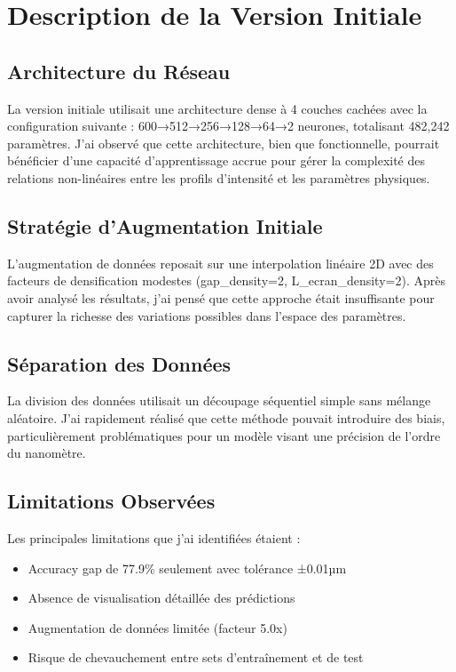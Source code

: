 \documentclass[10pt,twocolumn]{article}
\begin{document}
\section{Description de la Version Initiale}

\subsection{Architecture du Réseau}

La version initiale utilisait une architecture dense à 4 couches cachées avec la configuration suivante : 600→512→256→128→64→2 neurones, totalisant 482,242 paramètres. J'ai observé que cette architecture, bien que fonctionnelle, pourrait bénéficier d'une capacité d'apprentissage accrue pour gérer la complexité des relations non-linéaires entre les profils d'intensité et les paramètres physiques.

\subsection{Stratégie d'Augmentation Initiale}

L'augmentation de données reposait sur une interpolation linéaire 2D avec des facteurs de densification modestes (gap\_density=2, L\_ecran\_density=2). Après avoir analysé les résultats, j'ai pensé que cette approche était insuffisante pour capturer la richesse des variations possibles dans l'espace des paramètres.

\subsection{Séparation des Données}

La division des données utilisait un découpage séquentiel simple sans mélange aléatoire. J'ai rapidement réalisé que cette méthode pouvait introduire des biais, particulièrement problématiques pour un modèle visant une précision de l'ordre du nanomètre.

\subsection{Limitations Observées}

Les principales limitations que j'ai identifiées étaient :
\begin{itemize}
\item Accuracy gap de 77.9\% seulement avec tolérance ±0.01µm
\item Absence de visualisation détaillée des prédictions
\item Augmentation de données limitée (facteur 5.0x)
\item Risque de chevauchement entre sets d'entraînement et de test
\end{itemize}
\end{document}

